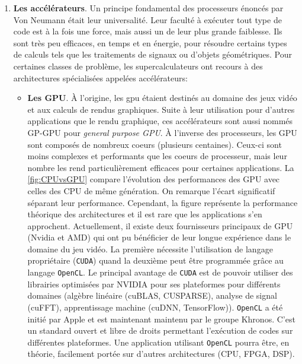 \begin{enumerate}
            \item \textbf{Les accélérateurs}. Un principe fondamental des processeurs énoncés par Von Neumann était leur universalité. Leur faculté à exécuter tout type de code est à la fois une force, mais aussi un de leur plus grande faiblesse. Ils sont très peu efficaces, en temps et en énergie, pour résoudre certains types de calculs tels que les traitements de signaux ou d'objets géométriques. Pour certaines classes de problème, les supercalculateurs ont recours à des architectures spécialisées appelées accélérateurs:
                \begin{itemize}
    
                    \item\textbf{Les GPU}. À l'origine, les \gls{gpu} étaient destinés au domaine des jeux vidéo et aux calculs de rendus graphiques. Suite à leur utilisation pour d'autres applications que le rendu graphique, ces accélérateurs sont aussi nommés GP-GPU pour \textit{general purpose GPU}. À l'inverse des processeurs, les GPU sont composés de nombreux coeurs (plusieurs centaines). Ceux-ci sont moins complexes et performants que les coeurs de processeur, mais leur nombre les rend particulièrement efficaces pour certaines applications. La \autoref{fig:CPUvsGPU} compare l'évolution des performances des GPU avec celles des CPU de même génération. On remarque l'écart significatif séparant leur performance. Cependant, la figure représente la performance théorique des architectures et il est rare que les applications s'en approchent. 
                    Actuellement, il existe deux fournisseurs principaux de GPU (Nvidia et AMD) qui ont pu bénéficier de leur longue expérience dans le domaine du jeu vidéo. La première nécessite l'utilisation de langage propriétaire (\verb|CUDA|) quand la deuxième peut être programmée grâce au langage \verb|OpenCL|. Le principal avantage de \verb|CUDA| est de pouvoir utiliser des librairies optimisées par NVIDIA pour ses plateformes pour différents domaines (algèbre linéaire (cuBLAS, CUSPARSE), analyse de signal (cuFFT), apprentissage machine (cuDNN, TensorFlow)). 
                    \verb|OpenCL| a été initié par Apple et est maintenant maintenu par le groupe Khronos. C'est un standard ouvert et libre de droits permettant l'exécution de codes sur différentes plateformes. Une application utilisant \verb|OpenCL| pourra être, en théorie, facilement portée sur d'autres architectures (CPU, FPGA, DSP). 
                    

\end{itemize}
\end{enumerate}
